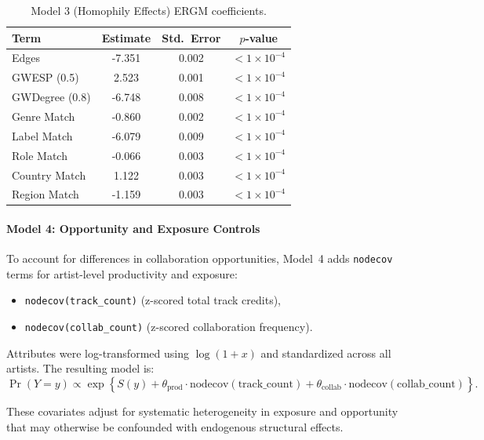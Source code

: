 \documentclass[fleqn,10pt]{wlscirep}
\begin{document}
\begin{table}[h!]
\centering
\caption{Model 3 (Homophily Effects) ERGM coefficients.}
\footnotesize
\begin{tabular}{lccc}
\hline
Term & Estimate & Std.\ Error & $p$-value \\
\hline
Edges & -7.351 & 0.002 & $< 1 \times 10^{-4}$ \\
GWESP (0.5) & 2.523 & 0.001 & $< 1 \times 10^{-4}$ \\
GWDegree (0.8) & -6.748 & 0.008 & $< 1 \times 10^{-4}$ \\
Genre Match & -0.860 & 0.002 & $< 1 \times 10^{-4}$ \\
Label Match & -6.079 & 0.009 & $< 1 \times 10^{-4}$ \\
Role Match & -0.066 & 0.003 & $< 1 \times 10^{-4}$ \\
Country Match & 1.122 & 0.003 & $< 1 \times 10^{-4}$ \\
Region Match & -1.159 & 0.003 & $< 1 \times 10^{-4}$ \\
\hline
\end{tabular}
\label{tab:model3}
\end{table}

\paragraph*{Model 4: Opportunity and Exposure Controls}
To account for differences in collaboration opportunities, Model~4 adds \texttt{nodecov} terms for artist-level productivity and exposure:
\begin{itemize}
    \item \texttt{nodecov(track\_count)} (z-scored total track credits),
    \item \texttt{nodecov(collab\_count)} (z-scored collaboration frequency).
\end{itemize}

Attributes were log-transformed using $\log(1 + x)$ and standardized across all artists. The resulting model is:
\begin{equation}
\Pr(Y = y) \propto
\exp\left\{
    S(y)
    + \theta_{\text{prod}} \cdot \text{nodecov}(\text{track\_count}) 
    + \theta_{\text{collab}} \cdot \text{nodecov}(\text{collab\_count})
\right\}.
\label{eq:model3-compact}
\end{equation}

These covariates adjust for systematic heterogeneity in exposure and opportunity that may otherwise be confounded with endogenous structural effects.
\end{document}

